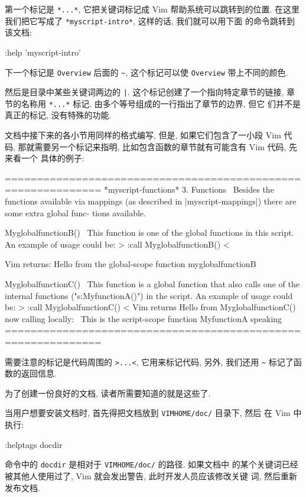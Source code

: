 第一个标记是 \texttt{*...*}, 它把关键词标记成 Vim 帮助系统可以跳转到的位置.
在这里我们把它写成了 \texttt{*myscript-intro*}, 这样的话, 我们就可以用下面
的命令跳转到该文档:
\begin{vimcode}
:help 'myscript-intro'
\end{vimcode}

下一个标记是 \texttt{Overview} 后面的 \verb'~', 这个标记可以使 \texttt{Overview}
带上不同的颜色.

然后是目录中某些关键词两边的 \verb'|'. 这个标记创建了一个指向特定章节的链接,
章节的名称用 \texttt{*...*} 标记. 由多个等号组成的一行指出了章节的边界, 但它
们并不是真正的标记, 没有特殊的功能.

文档中接下来的各小节用同样的格式编写, 但是, 如果它们包含了一小段 Vim 代码,
那就需要另一个标记来指明, 比如包含函数的章节就有可能含有 Vim 代码, 先来看一个
具体的例子:
\begin{vimcode}
=============================================================
										*myscript-functions*
3. Functions~
Besides the functions available via mappings (as described
in |myscript-mappings|) there are some extra global func-
tions available.

MyglobalfunctionB()~
This function is one of the global functions in this script.
An example of usage could be: >
		:call MyglobalfunctionB()
	<
\end{vimcode}
\begin{vimcode}
		Vim returns:
		 Hello from the global-scope function myglobalfunctionB~

	MyglobalfunctionC()~
	This function is a global function that also calls one of
	the internal functions ("s:MyfunctionA()") in the script.
	An example of usage could be: >
		:call MyglobalfunctionC()
	<
		Vim returns
		Hello from MyglobalfunctionC() now calling locally:~
		This is the script-scope function MyfunctionA speaking~
=============================================================
\end{vimcode}
需要注意的标记是代码周围的 \texttt{>...<}, 它用来标记代码, 另外, 我们还用
\verb'~' 标记了函数的返回信息.

为了创建一份良好的文档, 读者所需要知道的就是这些了.

当用户想要安装文档时, 首先得把文档放到 \texttt{VIMHOME/doc/} 目录下, 然后
在 Vim 中执行:
\begin{vimcode}
:helptags docdir
\end{vimcode}
命令中的 \texttt{docdir} 是相对于 \texttt{VIMHOME/doc/} 的路径. 如果文档中
的某个关键词已经被其他人使用过了, Vim 就会发出警告, 此时开发人员应该修改关键
词, 然后重新发布文档.

